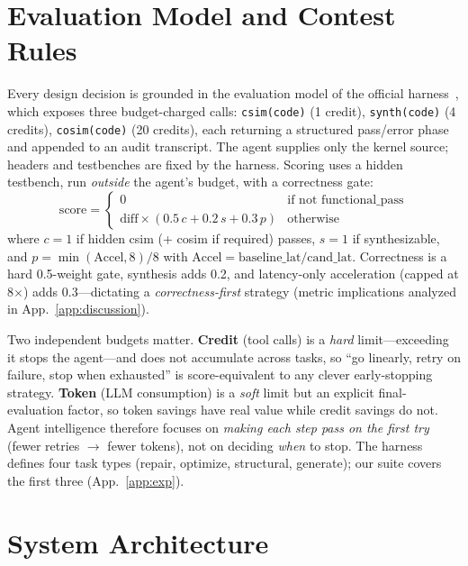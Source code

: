\documentclass[10pt,conference,letterpaper]{IEEEtran}
\begin{document}
\section{Evaluation Model and Contest Rules}
\label{sec:eval}

Every design decision is grounded in the evaluation model of the official harness~\cite{fpt26rules}, which exposes three budget-charged calls: \texttt{csim(code)} (1 credit), \texttt{synth(code)} (4 credits), \texttt{cosim(code)} (20 credits), each returning a structured pass/error phase and appended to an audit transcript. The agent supplies only the kernel source; headers and testbenches are fixed by the harness. Scoring uses a hidden testbench, run \emph{outside} the agent's budget, with a correctness gate:
\begin{equation}
\label{eq:score}
\text{score} = \begin{cases}
0 & \text{if not functional\_pass} \\
\text{diff} \times (0.5\,c + 0.2\,s + 0.3\,p) & \text{otherwise}
\end{cases}
\end{equation}
where $c=1$ if hidden csim (+ cosim if required) passes, $s=1$ if synthesizable, and $p = \min(\text{Accel}, 8)/8$ with $\text{Accel} = \text{baseline\_lat} / \text{cand\_lat}$. Correctness is a hard 0.5-weight gate, synthesis adds 0.2, and latency-only acceleration (capped at 8$\times$) adds 0.3---dictating a \emph{correctness-first} strategy (metric implications analyzed in App.~\ref{app:discussion}).

Two independent budgets matter. \textbf{Credit} (tool calls) is a \emph{hard} limit---exceeding it stops the agent---and does not accumulate across tasks, so ``go linearly, retry on failure, stop when exhausted'' is score-equivalent to any clever early-stopping strategy. \textbf{Token} (LLM consumption) is a \emph{soft} limit but an explicit final-evaluation factor, so token savings have real value while credit savings do not. Agent intelligence therefore focuses on \emph{making each step pass on the first try} (fewer retries $\to$ fewer tokens), not on deciding \emph{when} to stop. The harness defines four task types (repair, optimize, structural, generate); our suite covers the first three (App.~\ref{app:exp}).

\section{System Architecture}
\label{sec:arch}
\end{document}

